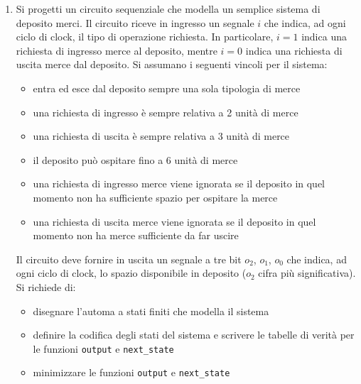 \documentclass{article}
\begin{document}
\begin{enumerate}
    \item Si progetti un circuito sequenziale che modella un semplice sistema di deposito merci. Il circuito riceve in ingresso un segnale $i$ che indica, ad ogni ciclo di clock, il tipo di operazione richiesta. In particolare, $i = 1$ indica una richiesta di ingresso merce al deposito, mentre $i = 0$ indica una richiesta di uscita merce dal deposito. Si assumano i seguenti vincoli per il sistema:
    \begin{itemize}
        \item entra ed esce dal deposito sempre una sola tipologia di merce
        \item una richiesta di ingresso è sempre relativa a 2 unità di merce
        \item una richiesta di uscita è sempre relativa a 3 unità di merce
        \item il deposito può ospitare fino a 6 unità di merce
        \item una richiesta di ingresso merce viene ignorata se il deposito in quel momento non ha sufficiente spazio per ospitare la merce
        \item una richiesta di uscita merce viene ignorata se il deposito in quel momento non ha merce sufficiente da far uscire
    \end{itemize}
    Il circuito deve fornire in uscita un segnale a tre bit $o_2$, $o_1$, $o_0$ che indica, ad ogni ciclo di clock, lo spazio disponibile in deposito ($o_2$ cifra più significativa). Si richiede di:
    \begin{itemize}
        \item disegnare l'automa a stati finiti che modella il sistema
        \item definire la codifica degli stati del sistema e scrivere le tabelle di verità per le funzioni \texttt{output} e \texttt{next\_state}
        \item minimizzare le funzioni \texttt{output} e \texttt{next\_state}
    \end{itemize}
\end{enumerate}
\end{document}
